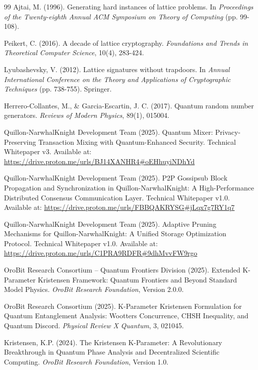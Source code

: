\documentclass[11pt,a4paper]{article}
\begin{document}
\begin{thebibliography}{99}
Ajtai, M. (1996).
Generating hard instances of lattice problems.
In \textit{Proceedings of the Twenty-eighth Annual ACM Symposium on Theory of Computing} (pp. 99-108).

Peikert, C. (2016).
A decade of lattice cryptography.
\textit{Foundations and Trends in Theoretical Computer Science}, 10(4), 283-424.

Lyubashevsky, V. (2012).
Lattice signatures without trapdoors.
In \textit{Annual International Conference on the Theory and Applications of Cryptographic Techniques} (pp. 738-755). Springer.

Herrero-Collantes, M., \& Garcia-Escartin, J. C. (2017).
Quantum random number generators.
\textit{Reviews of Modern Physics}, 89(1), 015004.

Quillon-NarwhalKnight Development Team (2025).
Quantum Mixer: Privacy-Preserving Transaction Mixing with Quantum-Enhanced Security.
Technical Whitepaper v3.
Available at: \url{https://drive.proton.me/urls/BJ14XANHR4#oEHhuyiNDhYd}

Quillon-NarwhalKnight Development Team (2025).
P2P Gossipsub Block Propagation and Synchronization in Quillon-NarwhalKnight: A High-Performance Distributed Consensus Communication Layer.
Technical Whitepaper v1.0.
Available at: \url{https://drive.proton.me/urls/FBBQAKRYSG#jLqx7g7RY1q7}

Quillon-NarwhalKnight Development Team (2025).
Adaptive Pruning Mechanisms for Quillon-NarwhalKnight: A Unified Storage Optimization Protocol.
Technical Whitepaper v1.0.
Available at: \url{https://drive.proton.me/urls/C1PRA9RDFR#9dhMvvFW9rgo}

OroBit Research Consortium -- Quantum Frontiers Division (2025).
Extended K-Parameter Kristensen Framework: Quantum Frontiers and Beyond Standard Model Physics.
\textit{OroBit Research Foundation}, Version 2.0.0.

OroBit Research Consortium (2025).
K-Parameter Kristensen Formulation for Quantum Entanglement Analysis: Wootters Concurrence, CHSH Inequality, and Quantum Discord.
\textit{Physical Review X Quantum}, 3, 021045.

Kristensen, K.P. (2024).
The Kristensen K-Parameter: A Revolutionary Breakthrough in Quantum Phase Analysis and Decentralized Scientific Computing.
\textit{OroBit Research Foundation}, Version 1.0.


\end{thebibliography}
\end{document}
